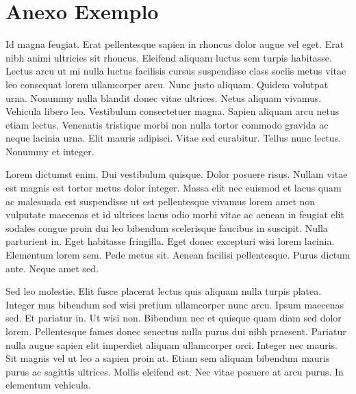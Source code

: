 %
%
% 
%
\chapter{Anexo Exemplo}
\noindent
Id magna feugiat. Erat pellentesque sapien in rhoncus dolor augue vel eget. Erat nibh animi ultricies sit rhoncus. Eleifend aliquam luctus sem turpis habitasse. Lectus arcu ut mi nulla luctus facilisis cursus suspendisse class sociis metus vitae leo consequat lorem ullamcorper arcu. Nunc justo aliquam. Quidem volutpat urna. Nonummy nulla blandit donec vitae ultrices. Netus aliquam vivamus. Vehicula libero leo. Vestibulum consectetuer magna. Sapien aliquam arcu netus etiam lectus. Venenatis tristique morbi non nulla tortor commodo gravida ac neque lacinia urna. Elit mauris adipisci. Vitae sed curabitur. Tellus nunc lectus. Nonummy et integer.

Lorem dictumst enim. Dui vestibulum quisque. Dolor posuere risus. Nullam vitae est magnis est tortor metus dolor integer. Massa elit nec euismod et lacus quam ac malesuada est suspendisse ut est pellentesque vivamus lorem amet non vulputate maecenas et id ultrices lacus odio morbi vitae ac aenean in feugiat elit sodales congue proin dui leo bibendum scelerisque faucibus in suscipit. Nulla parturient in. Eget habitasse fringilla. Eget donec excepturi wisi lorem lacinia. Elementum lorem sem. Pede metus sit. Aenean facilisi pellentesque. Purus dictum ante. Neque amet sed.

Sed leo molestie. Elit fusce placerat lectus quis aliquam nulla turpis platea. Integer mus bibendum sed wisi pretium ullamcorper nunc arcu. Ipsum maecenas sed. Et pariatur in. Ut wisi non. Bibendum nec et quisque quam diam sed dolor lorem. Pellentesque fames donec senectus nulla purus dui nibh praesent. Pariatur nulla augue sapien elit imperdiet aliquam ullamcorper orci. Integer nec mauris. Sit magnis vel ut leo a sapien proin at. Etiam sem aliquam bibendum mauris purus ac sagittis ultrices. Mollis eleifend est. Nec vitae posuere at arcu purus. In elementum vehicula.

